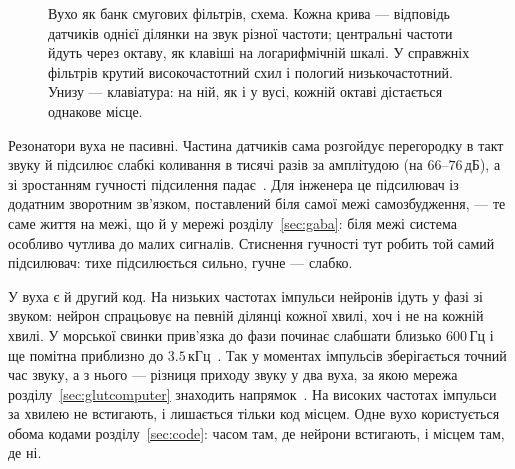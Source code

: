 \begin{figure}[t]
\centering
{}
\caption{Вухо як банк смугових фільтрів, схема. Кожна крива --- відповідь датчиків однієї ділянки на звук різної частоти; центральні частоти йдуть через октаву, як клавіші на логарифмічній шкалі. У справжніх фільтрів крутий високочастотний схил і пологий низькочастотний. Унизу --- клавіатура: на ній, як і у вусі, кожній октаві дістається однакове місце.}
\label{fig:filterbank}
\end{figure}

Резонатори вуха не пасивні. Частина датчиків сама розгойдує перегородку в такт звуку й підсилює слабкі коливання в тисячі разів за амплітудою (на $66$--$76$\,дБ), а зі зростанням гучності підсилення падає~\cite{Ruggero1997,Robles2001}. Для інженера це підсилювач із додатним зворотним зв'язком, поставлений біля самої межі самозбудження, --- те саме життя на межі, що й у мережі розділу~\ref{sec:gaba}: біля межі система особливо чутлива до малих сигналів. Стиснення гучності тут робить той самий підсилювач: тихе підсилюється сильно, гучне --- слабко.

У вуха є й другий код. На низьких частотах імпульси нейронів ідуть у фазі зі звуком: нейрон спрацьовує на певній ділянці кожної хвилі, хоч і не на кожній хвилі. У морської свинки прив'язка до фази починає слабшати близько $600$\,Гц і ще помітна приблизно до $3.5$\,кГц~\cite{PalmerRussell1986}. Так у моментах імпульсів зберігається точний час звуку, а з нього --- різниця приходу звуку у два вуха, за якою мережа розділу~\ref{sec:glutcomputer} знаходить напрямок~\cite{Grothe2010}. На високих частотах імпульси за хвилею не встигають, і лишається тільки код місцем. Одне вухо користується обома кодами розділу~\ref{sec:code}: часом там, де нейрони встигають, і місцем там, де ні.

